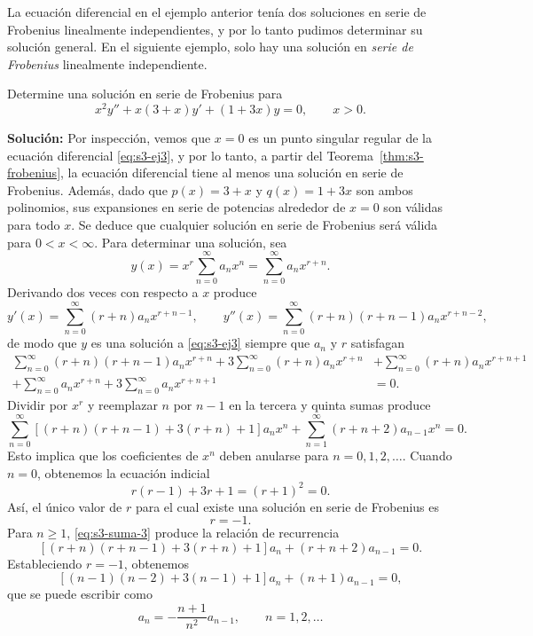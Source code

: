 La ecuación diferencial en el ejemplo anterior tenía dos soluciones en serie de Frobenius linealmente independientes, y por lo tanto pudimos determinar su solución general. En el siguiente ejemplo, solo hay una solución en \textit{serie de Frobenius} linealmente independiente.
 
\begin{example}\label{ex:s3-una}
    Determine una solución en serie de Frobenius para
\begin{equation}
x^2 y'' + x(3 + x)y' + (1 + 3x)y = 0, \qquad x > 0.
\label{eq:s3-ej3}
\end{equation}
 
\noindent \textbf{Solución:} \quad Por inspección, vemos que $x = 0$ es un punto singular regular de la ecuación diferencial \eqref{eq:s3-ej3}, y por lo tanto, a partir del Teorema~\ref{thm:s3-frobenius}, la ecuación diferencial tiene al menos una solución en serie de Frobenius. Además, dado que $p(x) = 3 + x$ y $q(x) = 1 + 3x$ son ambos polinomios, sus expansiones en serie de potencias alrededor de $x = 0$ son válidas para todo $x$. Se deduce que cualquier solución en serie de Frobenius será válida para $0 < x < \infty$. Para determinar una solución, sea
\[ y(x) = x^r \sum_{n=0}^{\infty} a_n x^n = \sum_{n=0}^{\infty} a_n x^{r+n}. \]
Derivando dos veces con respecto a $x$ produce
\[ y'(x) = \sum_{n=0}^{\infty} (r + n)a_n x^{r+n-1}, \qquad y''(x) = \sum_{n=0}^{\infty} (r + n)(r + n - 1)a_n x^{r+n-2}, \]
de modo que $y$ es una solución a \eqref{eq:s3-ej3} siempre que $a_n$ y $r$ satisfagan
\begin{align*}
\sum_{n=0}^{\infty} (r + n)(r + n - 1)a_n x^{r+n} + 3\sum_{n=0}^{\infty} (r + n)a_n x^{r+n} &+ \sum_{n=0}^{\infty} (r + n)a_n x^{r+n+1} \\
+ \sum_{n=0}^{\infty} a_n x^{r+n} + 3\sum_{n=0}^{\infty} a_n x^{r+n+1} &= 0.
\end{align*}
Dividir por $x^r$ y reemplazar $n$ por $n - 1$ en la tercera y quinta sumas produce
\begin{equation}
\sum_{n=0}^{\infty} [(r + n)(r + n - 1) + 3(r + n) + 1]a_n x^n + \sum_{n=1}^{\infty} (r + n + 2)a_{n-1}x^n = 0.
\label{eq:s3-suma-3}
\end{equation}
Esto implica que los coeficientes de $x^n$ deben anularse para $n = 0, 1, 2, \dots$. Cuando $n = 0$, obtenemos la ecuación indicial
\[ r(r - 1) + 3r + 1 = (r + 1)^2 = 0. \]
Así, el único valor de $r$ para el cual existe una solución en serie de Frobenius es
\[ r = -1. \]
Para $n \ge 1$, \eqref{eq:s3-suma-3} produce la relación de recurrencia
\[ [(r + n)(r + n - 1) + 3(r + n) + 1]a_n + (r + n + 2)a_{n-1} = 0. \]
Estableciendo $r = -1$, obtenemos
\[ [(n - 1)(n - 2) + 3(n - 1) + 1]a_n + (n + 1)a_{n-1} = 0, \]
que se puede escribir como
\[ a_n = -\frac{n + 1}{n^2}a_{n-1}, \qquad n = 1, 2, \dots \]
 

\end{example}
